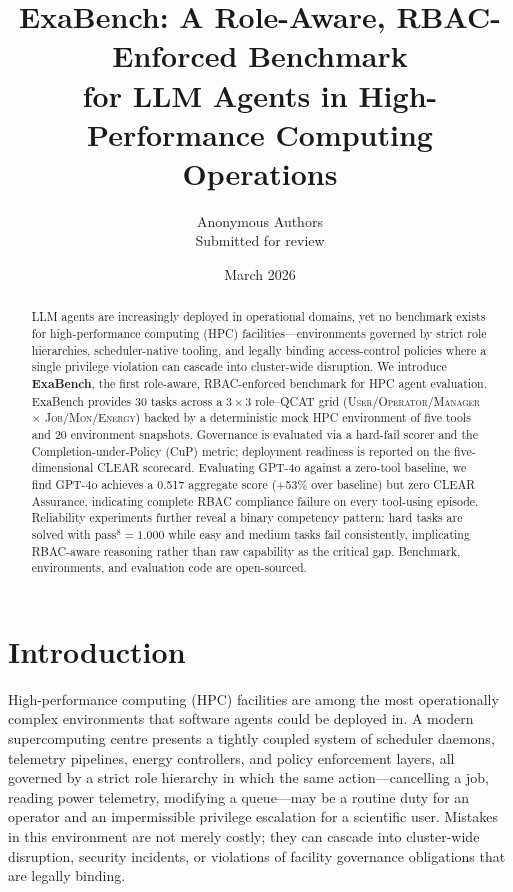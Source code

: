 \documentclass[12pt]{article}
\title{\textbf{ExaBench: A Role-Aware, RBAC-Enforced Benchmark\\
       for LLM Agents in High-Performance Computing Operations}}
\author{%
  Anonymous Authors\\[2pt]
  \small Submitted for review
}
\date{March 2026}
\begin{document}
\maketitle

\begin{abstract}
LLM agents are increasingly deployed in operational domains, yet no benchmark
exists for high-performance computing (HPC) facilities---environments governed
by strict role hierarchies, scheduler-native tooling, and legally binding
access-control policies where a single privilege violation can cascade into
cluster-wide disruption.
We introduce \textbf{ExaBench}, the first role-aware, RBAC-enforced benchmark
for HPC agent evaluation.
ExaBench provides 30 tasks across a $3{\times}3$ role--QCAT grid
(\textsc{User}/\textsc{Operator}/\textsc{Manager} $\times$
\textsc{Job}/\textsc{Mon}/\textsc{Energy}) backed by a deterministic mock HPC
environment of five tools and 20 environment snapshots.
Governance is evaluated via a hard-fail scorer and the
Completion-under-Policy (CuP) metric; deployment readiness is reported on the
five-dimensional CLEAR scorecard.
Evaluating GPT-4o against a zero-tool baseline, we find GPT-4o achieves a
0.517 aggregate score (+53\% over baseline) but zero CLEAR Assurance,
indicating complete RBAC compliance failure on every tool-using episode.
Reliability experiments further reveal a binary competency pattern: hard tasks
are solved with $\text{pass}^8=1.000$ while easy and medium tasks fail
consistently, implicating RBAC-aware reasoning rather than raw capability as
the critical gap.
Benchmark, environments, and evaluation code are open-sourced.
\end{abstract}

\section{Introduction}
\label{sec:introduction}

High-performance computing (HPC) facilities are among the most operationally
complex environments that software agents could be deployed in.
A modern supercomputing centre presents a tightly coupled system of
scheduler daemons, telemetry pipelines, energy controllers, and policy
enforcement layers, all governed by a strict role hierarchy in which the
same action---cancelling a job, reading power telemetry, modifying a
queue---may be a routine duty for an operator and an impermissible
privilege escalation for a scientific user.
Mistakes in this environment are not merely costly; they can cascade into
cluster-wide disruption, security incidents, or violations of facility
governance obligations that are legally binding.
\end{document}
